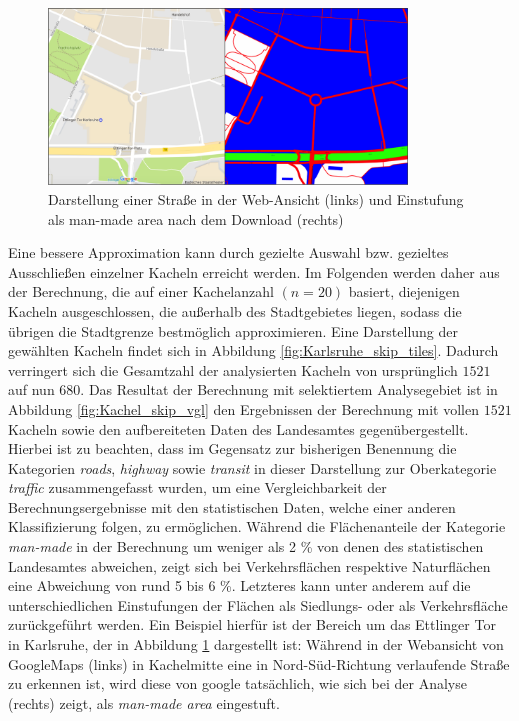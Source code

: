 \begin{figure}
  \centering
    \includegraphics[width=0.85\textwidth]{images/3_google_Einstufung_Nutzung.png}
    \caption{Darstellung einer Straße in der Web-Ansicht (links) und Einstufung als man-made area nach dem Download (rechts)}
    \label{fig:versch_nutz_einstuf}
\end{figure}

Eine bessere Approximation kann durch gezielte Auswahl bzw. gezieltes Ausschließen einzelner Kacheln erreicht werden. Im Folgenden werden daher aus der Berechnung, die auf einer Kachelanzahl \((n=20)\) basiert, diejenigen Kacheln ausgeschlossen, die außerhalb des Stadtgebietes liegen, sodass die übrigen die Stadtgrenze bestmöglich approximieren. Eine Darstellung der gewählten Kacheln findet sich in Abbildung \ref{fig:Karlsruhe_skip_tiles}. Dadurch verringert sich die Gesamtzahl der analysierten Kacheln von  ursprünglich \(1521\) auf nun \(680\). Das Resultat der Berechnung mit selektiertem Analysegebiet ist in Abbildung \ref{fig:Kachel_skip_vgl} den Ergebnissen der Berechnung mit vollen \(1521\) Kacheln sowie den aufbereiteten Daten des Landesamtes gegenübergestellt. Hierbei ist zu beachten, dass im Gegensatz zur bisherigen Benennung die Kategorien \textit{roads}, \textit{highway} sowie \textit{transit} in dieser Darstellung zur Oberkategorie \textit{traffic} zusammengefasst wurden, um eine Vergleichbarkeit der Berechnungsergebnisse mit den statistischen Daten, welche einer anderen Klassifizierung folgen, zu ermöglichen. Während die Flächenanteile der Kategorie \textit{man-made} in der Berechnung um weniger als  \num{2} \% von denen des statistischen Landesamtes abweichen, zeigt sich bei Verkehrsflächen respektive Naturflächen eine Abweichung von rund \num{5} bis \num{6} \%. Letzteres kann unter anderem auf die unterschiedlichen Einstufungen der Flächen als Siedlungs- oder als Verkehrsfläche zurückgeführt werden. Ein Beispiel hierfür ist der Bereich um das Ettlinger Tor in Karlsruhe, der in Abbildung \ref{fig:versch_nutz_einstuf} dargestellt ist: Während in der Webansicht von GoogleMaps (links) in Kachelmitte eine in Nord-Süd-Richtung verlaufende Straße zu erkennen ist, wird diese von google tatsächlich, wie sich bei der Analyse (rechts) zeigt, als \textit{man-made area} eingestuft.\\

